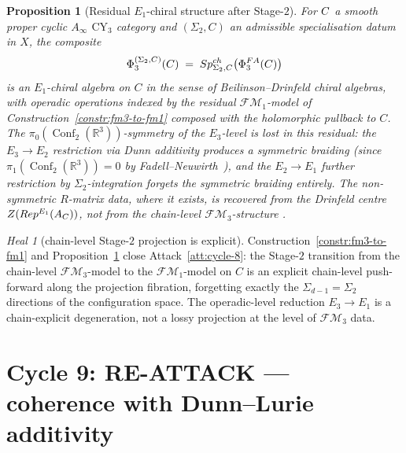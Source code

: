 \documentclass[11pt]{article}
\newtheorem{proposition}[theorem]{Proposition}
\theoremstyle{definition}
\theoremstyle{remark}
\newtheorem{heal}[theorem]{Heal}
\DeclareMathOperator{\Conf}{Conf}
\newcommand{\FM}{\mathcal{FM}}
\newcommand{\Ainf}{A_{\infty}}
\newcommand{\Eone}{E_1}
\newcommand{\Etwo}{E_2}
\newcommand{\PhiFA}{\Phi^{\mathrm{FA}}}
\newcommand{\SpCh}{\mathrm{Sp}^{\mathrm{ch}}}
\newcommand{\CY}{\mathrm{CY}}
\begin{document}
\begin{proposition}[Residual $\Eone$-chiral structure after Stage-$2$]
\label{prop:e1-residual}
For $C$ a smooth proper cyclic $\Ainf$ $\CY_3$ category and
$(\Sigma_2, C)$ an admissible specialisation datum in $X$, the
composite
\[
 \Phi_3^{(\Sigma_2, C)}(\cC) \;=\;
  \SpCh_{\Sigma_2, C}\!\left(\PhiFA_3(\cC)\right)
\]
is an $\Eone$-chiral algebra on $C$ in the sense of Beilinson--Drinfeld
chiral algebras, with operadic operations indexed by the residual
$\FM_1$-model of Construction~\ref{constr:fm3-to-fm1} composed with the
holomorphic pullback to $C$. The $\pi_0(\Conf_2(\mathbb{R}^3))$-symmetry
of the $E_3$-level is lost in this residual: the $E_3 \to \Etwo$
restriction via Dunn additivity produces a \emph{symmetric} braiding
(since $\pi_1(\Conf_2(\mathbb{R}^3)) = 0$ by
Fadell--Neuwirth~\cite{FadellNeuwirth1962}), and the
$\Etwo \to \Eone$ further restriction by $\Sigma_2$-integration forgets
the symmetric braiding entirely. The non-symmetric $R$-matrix data,
where it exists, is recovered from the Drinfeld centre
$\cZ(\mathrm{Rep}^{\Eone}(A_\cC))$, not from the chain-level
$\FM_3$-structure \cite[target chapter \texttt{cy\_to\_chiral.tex}
Theorem~\texttt{c3-drinfeld-center}]{VolIII}.
\end{proposition}

\begin{heal}[chain-level Stage-$2$ projection is explicit]
\label{heal:cycle-8}
Construction~\ref{constr:fm3-to-fm1} and Proposition~\ref{prop:e1-residual}
close Attack~\ref{att:cycle-8}: the Stage-$2$ transition from the
chain-level $\FM_3$-model to the $\FM_1$-model on $C$ is an explicit
chain-level push-forward along the projection fibration, forgetting
exactly the $\Sigma_{d-1} = \Sigma_2$ directions of the configuration
space. The operadic-level reduction $E_3 \to \Eone$ is a
chain-explicit degeneration, not a lossy projection at the level of
$\FM_3$ data.
\end{heal}

\section{Cycle 9: RE-ATTACK --- coherence with Dunn--Lurie additivity}
\end{document}
